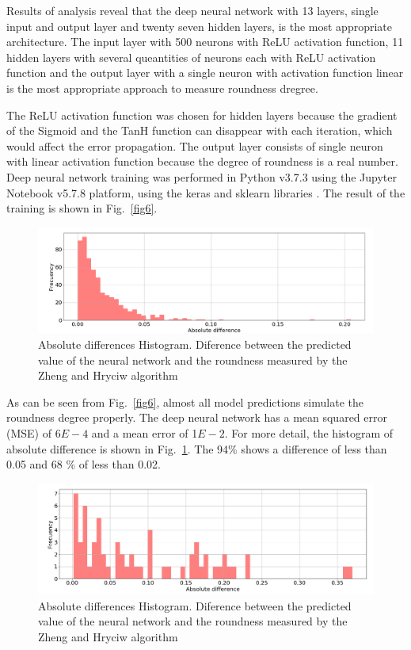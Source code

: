 \documentclass[conference]{IEEEtran}
\begin{document}
Results of analysis reveal that the deep neural network with 13 layers, single input and output layer and twenty seven hidden layers, is the most appropriate architecture. The input layer with 500 neurons with ReLU activation function, 11 hidden layers with several queantities of neurons each with ReLU activation function and the output layer with a single neuron with activation function linear is the most appropriate approach to measure roundness dregree. 

The ReLU activation function was chosen for hidden layers because the gradient of the Sigmoid and the TanH function can disappear with each iteration, which would affect the error propagation. The output layer consists of single neuron with linear activation function because the degree of roundness is a real number. Deep neural network training was performed in Python v3.7.3 using the Jupyter Notebook v5.7.8 platform, using the keras and sklearn libraries \cite{b13}. The result of the training is shown in Fig.~\ref{fig6}.

\begin{figure}[htbp]
	\centerline{\includegraphics[scale=0.35]{fig7.png}}
	\caption{Absolute differences Histogram. Diference between the predicted value of the neural network and the roundness measured by the Zheng and Hryciw algorithm}
	\label{fig7}
\end{figure}


As can be seen from Fig.~\ref{fig6}, almost all model predictions simulate the roundness degree properly. The deep neural network has a mean squared error (MSE) of 6$E-4$ and a mean error of 1$E-2$. For more detail, the histogram of absolute difference is shown in Fig.~\ref{fig7}. The 94\% shows a difference of less than 0.05 and 68 \% of less than 0.02.

\begin{figure}[htbp]
	\centerline{\includegraphics[scale=0.35]{fig8.png}}
	\caption{Absolute differences Histogram. Diference between the predicted value of the neural network and the roundness measured by the Zheng and Hryciw algorithm}
	\label{fig8}
\end{figure}
\end{document}
